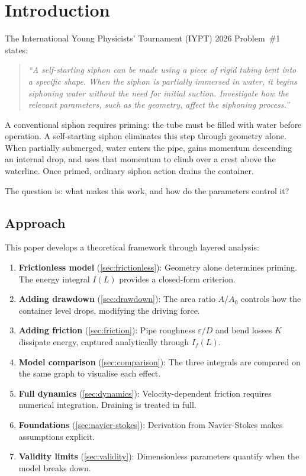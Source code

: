 \documentclass[11pt]{article}
\begin{document}
\section{Introduction}
\label{sec:intro}

The International Young Physicists' Tournament (IYPT) 2026 Problem~\#1 states:
\begin{quote}
\emph{``A self-starting siphon can be made using a piece of rigid tubing bent into a specific shape. When the siphon is partially immersed in water, it begins siphoning water without the need for initial suction. Investigate how the relevant parameters, such as the geometry, affect the siphoning process.''}
\end{quote}

A conventional siphon requires priming: the tube must be filled with water before operation. A self-starting siphon eliminates this step through geometry alone. When partially submerged, water enters the pipe, gains momentum descending an internal drop, and uses that momentum to climb over a crest above the waterline. Once primed, ordinary siphon action drains the container.

The question is: what makes this work, and how do the parameters control it?

\subsection{Approach}

This paper develops a theoretical framework through layered analysis:

\begin{enumerate}[nosep,leftmargin=2em]
  \item \textbf{Frictionless model} (\cref{sec:frictionless}): Geometry alone determines priming. The energy integral $I(L)$ provides a closed-form criterion.
  \item \textbf{Adding drawdown} (\cref{sec:drawdown}): The area ratio $A/A_0$ controls how the container level drops, modifying the driving force.
  \item \textbf{Adding friction} (\cref{sec:friction}): Pipe roughness $\varepsilon/D$ and bend losses $K$ dissipate energy, captured analytically through $I_f(L)$.
  \item \textbf{Model comparison} (\cref{sec:comparison}): The three integrals are compared on the same graph to visualise each effect.
  \item \textbf{Full dynamics} (\cref{sec:dynamics}): Velocity-dependent friction requires numerical integration. Draining is treated in full.
  \item \textbf{Foundations} (\cref{sec:navier-stokes}): Derivation from Navier-Stokes makes assumptions explicit.
  \item \textbf{Validity limits} (\cref{sec:validity}): Dimensionless parameters quantify when the model breaks down.
\end{enumerate}
\end{document}
